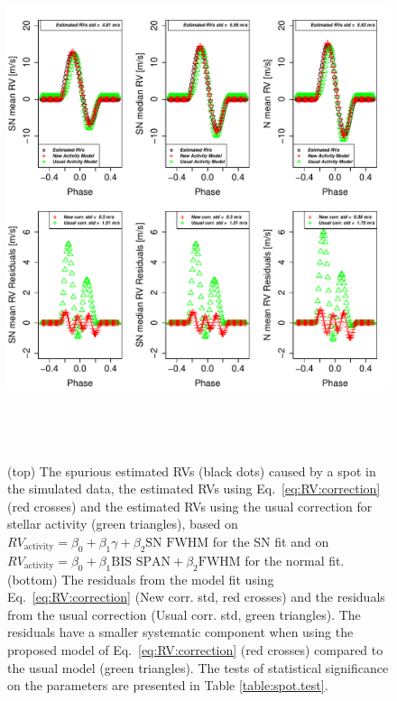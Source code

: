 \documentclass{aa}
\begin{document}
\begin{figure}[htbp]
\begin{center}
\includegraphics[height = 6in]{Spot_NEW_CORRECTION_[3]CorrectionActivity_RadialVelocity_vs_time.pdf} 
   \caption{(top) The spurious estimated RVs (black dots) caused by a spot in the simulated data, the estimated RVs using Eq.~\ref{eq:RV:correction} (red crosses) and the estimated RVs using the usual correction for stellar activity (green triangles), based on $RV_{\text{activity}}=\beta_0+\beta_1 \gamma + \beta_2 \text{SN FWHM}$ for the SN fit and on $RV_{\text{activity}}=\beta_0+\beta_1 \text{BIS SPAN} + \beta_2 \text{FWHM}$ for the normal fit.
 (bottom) The residuals from the model fit using Eq.~\ref{eq:RV:correction} (New corr. std, red crosses) and the residuals from the usual correction (Usual corr. std, green triangles). The residuals have a smaller systematic component when using the proposed model of 
  Eq.~\ref{eq:RV:correction} (red crosses) compared to the usual model (green triangles).
The tests of statistical significance on the parameters are presented in Table \ref{table:spot.test}.
}
    \label{fig:spot.correction}
\end{center}
\end{figure}
\end{document}
